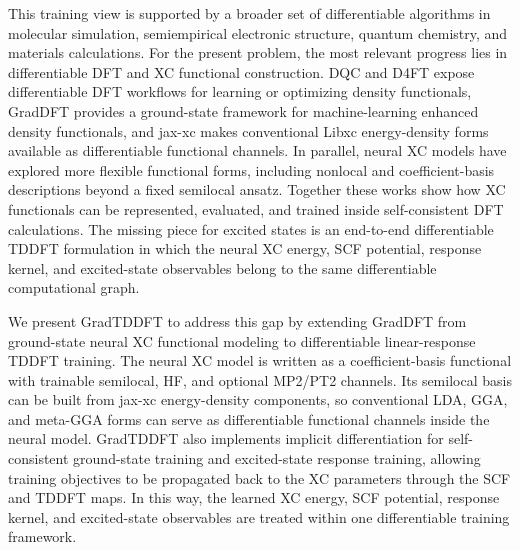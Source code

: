 This training view is supported by a broader set of differentiable
algorithms in molecular simulation, semiempirical electronic
structure, quantum chemistry, and materials calculations.\cite{JAXMD,DXTB,Athavale2026DifferentiableSemiempirical,PySCFAD,JRystal,JRystalDirectOptimization,Schmitz2025ADDFPT}
For the present problem, the most relevant progress lies in
differentiable DFT and XC functional construction. DQC and D4FT expose
differentiable DFT workflows for learning or optimizing density
functionals,\cite{DQC,D4FT} GradDFT provides a ground-state framework
for machine-learning enhanced density functionals,\cite{GradDFT} and
jax-xc makes conventional Libxc energy-density forms available as
differentiable functional channels.\cite{JAXXC} In parallel, neural XC
models have explored more flexible functional forms, including
nonlocal and coefficient-basis descriptions beyond a fixed semilocal
ansatz.\cite{Schmidt2019NonlocalXCML,GLOBE,KovacsDLDH2026} Together
these works show how XC functionals can be represented, evaluated, and
trained inside self-consistent DFT calculations. The missing piece for
excited states is an end-to-end differentiable TDDFT formulation in
which the neural XC energy, SCF potential, response kernel, and
excited-state observables belong to the same differentiable
computational graph.

We present GradTDDFT to address this gap by extending GradDFT from
ground-state neural XC functional modeling to differentiable
linear-response TDDFT training. The neural XC model is written as a
coefficient-basis functional with trainable semilocal, HF, and
optional MP2/PT2 channels. Its semilocal basis can be built from
jax-xc energy-density components, so conventional LDA, GGA, and
meta-GGA forms can serve as differentiable functional channels inside
the neural model. GradTDDFT also implements implicit differentiation
for self-consistent ground-state training and excited-state response
training, allowing training objectives to be propagated back to the
XC parameters through the SCF and TDDFT maps. In this way, the
learned XC energy, SCF potential, response kernel, and excited-state
observables are treated within one differentiable training framework.
